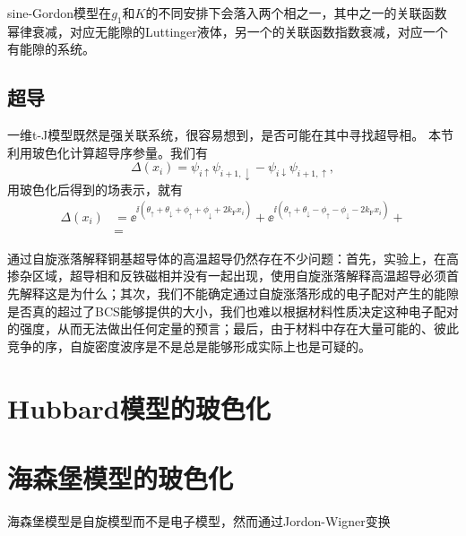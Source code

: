 sine-Gordon模型在$g_1$和$K$的不同安排下会落入两个相之一，其中之一的关联函数幂律衰减，对应无能隙的Luttinger液体，另一个的关联函数指数衰减，对应一个有能隙的系统。

\subsection{超导}

一维t-J模型既然是强关联系统，很容易想到，是否可能在其中寻找超导相。
本节利用玻色化计算超导序参量。我们有
\begin{equation}
    \Delta(x_i) = \psi_{i \uparrow} \psi_{i+1, \downarrow} - \psi_{i \downarrow} \psi_{i+1, \uparrow},
\end{equation}
用玻色化后得到的场表示，就有
\begin{equation}
    \begin{aligned}
        \Delta(x_i) &= \ee^{\ii (\theta_\uparrow + \theta_\downarrow + \phi_\uparrow + \phi_\downarrow + 2 k_\text{F} x_i)} + \ee^{\ii (\theta_\uparrow + \theta_\downarrow - \phi_\uparrow - \phi_\downarrow - 2 k_\text{F} x_i)} + \\
        &= 
    \end{aligned}
\end{equation}

通过自旋涨落解释铜基超导体的高温超导仍然存在不少问题：首先，实验上，在高掺杂区域，超导相和反铁磁相并没有一起出现，使用自旋涨落解释高温超导必须首先解释这是为什么；其次，我们不能确定通过自旋涨落形成的电子配对产生的能隙是否真的超过了BCS能够提供的大小，我们也难以根据材料性质决定这种电子配对的强度，从而无法做出任何定量的预言；最后，由于材料中存在大量可能的、彼此竞争的序，自旋密度波序是不是总是能够形成实际上也是可疑的。

\section{Hubbard模型的玻色化}

\section{海森堡模型的玻色化}

海森堡模型是自旋模型而不是电子模型，然而通过Jordon-Wigner变换 %